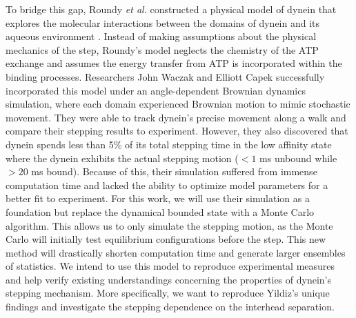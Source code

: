 To bridge this gap, Roundy \textit{et al.} constructed a physical model of dynein that explores the molecular interactions between the domains of dynein and its aqueous environment \cite{Capek2017, waczak2019drunken}. Instead of making assumptions about the physical mechanics of the step, Roundy's model neglects the chemistry of the ATP exchange and assumes the energy transfer from ATP is incorporated within the binding processes. Researchers John Waczak and Elliott Capek successfully incorporated this model under an angle-dependent Brownian dynamics simulation, where each domain experienced Brownian motion to mimic stochastic movement. They were able to track dynein's precise movement along a walk and compare their stepping results to experiment. However, they also discovered that dynein spends less than 5\% of its total stepping time in the low affinity state where the dynein exhibits the actual stepping motion ($<1$ ms unbound while $>20$ ms bound). Because of this, their simulation suffered from immense computation time and lacked the ability to optimize model parameters for a better fit to experiment. For this work, we will use their simulation as a foundation but replace the dynamical bounded state with a Monte Carlo algorithm. This allows us to only simulate the stepping motion, as the Monte Carlo will initially test equilibrium configurations before the step. This new method will drastically shorten computation time and generate larger ensembles of statistics. We intend to use this model to reproduce experimental measures and help verify existing understandings concerning the properties of dynein’s stepping mechanism. More specifically, we want to reproduce Yildiz's unique findings and investigate the stepping dependence on the interhead separation. 



